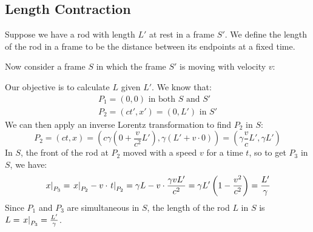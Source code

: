 \documentclass[../main.tex]{subfiles}
\begin{document}
\subsection{Length Contraction}
\label{lengthContraction}
Suppose we have a rod with length $L'$ at rest in a frame $S'$.
We define the length of the rod in a frame to be the distance between its endpoints at a fixed time.
\begin{center}
\end{center}
Now consider a frame $S$ in which the frame $S'$ is moving with velocity $v$:
\begin{center}
\end{center}
Our objective is to calculate $L$ given $L'$.
We know that:
\begin{align*}
  P_1 = (0, 0) \text{ in both $S$ and $S'$} \\
  P_2 = (ct', x') = (0, L') \text{ in $S'$}
\end{align*}
We can then apply an inverse Lorentz transformation to find $P_2$ in $S$:
\[
  P_2 = (ct, x) = \left(c\gamma\left(0 + \frac{v}{c^2}L'\right), \gamma(L' + v \cdot 0)\right) = \left(\gamma \frac{v}{c} L', \gamma L'\right)
\]
In $S$, the front of the rod at $P_2$ moved with a speed $v$ for a time $t$, so to get $P_3$ in $S$, we have:
\[
  \left. x \right|_{P_3} = \left. x \right|_{P_2} - v \cdot \left. t \right|_{P_2} = \gamma L - v \cdot \frac{\gamma v L'}{c^2} = \gamma L' \left(1 - \frac{v^2}{c^2}\right) = \frac{L'}{\gamma}
\]
Since $P_1$ and $P_3$ are simultaneous in $S$, the length of the rod $L$ in $S$ is $L = \left. x \right|_{P_3} = \frac{L'}{\gamma}$.
\end{document}

